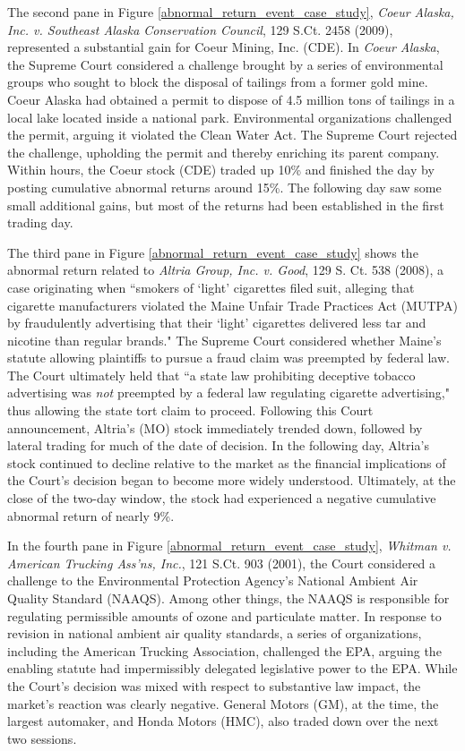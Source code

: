 \documentclass[preprint,12pt]{elsarticle}
\begin{document}
The second pane in Figure \ref{abnormal_return_event_case_study},  \textit{Coeur Alaska, Inc. v. Southeast Alaska Conservation Council}, 129 S.Ct. 2458 (2009), represented a substantial gain for Coeur Mining, Inc. (CDE).  In \textit{Coeur Alaska}, the Supreme Court considered a challenge brought by a series of environmental groups who sought to block the disposal of tailings from a former gold mine.  Coeur Alaska had obtained a permit to dispose of 4.5 million tons of tailings in a local lake located inside a national park. Environmental organizations challenged the permit, arguing it violated the Clean Water Act.  The Supreme Court rejected the challenge, upholding the permit and thereby enriching its parent company.  Within hours, the Coeur stock (CDE) traded up 10\% and finished the day by posting cumulative abnormal returns around 15\%.  The following day saw some small additional gains, but most of the returns had been established in the first trading day.

The third pane in Figure \ref{abnormal_return_event_case_study} shows the abnormal return related to \textit{Altria Group, Inc. v. Good}, 129 S. Ct. 538 (2008), a case originating when ``smokers of `light' cigarettes filed suit, alleging that cigarette manufacturers violated the Maine Unfair Trade Practices Act (MUTPA) by fraudulently advertising that their `light' cigarettes delivered less tar and nicotine than regular brands." The Supreme Court considered whether Maine's statute allowing plaintiffs to pursue a fraud claim was preempted by federal law.  The Court ultimately held that ``a state law prohibiting deceptive tobacco advertising was \textit{not} preempted by a federal law regulating cigarette advertising," thus allowing the state tort claim to proceed.  Following this Court announcement, Altria's (MO) stock immediately trended down, followed by lateral trading for much of the date of decision.  In the following day, Altria's stock continued to decline relative to the market as the financial implications of the Court's decision began to become more widely understood.  Ultimately, at the close of the two-day window, the stock had experienced a negative cumulative abnormal return of nearly 9\%.   

In the fourth pane in Figure \ref{abnormal_return_event_case_study}, \textit{Whitman v. American Trucking Ass'ns, Inc.}, 121 S.Ct. 903 (2001), the Court considered a challenge to the Environmental Protection Agency's National Ambient Air Quality Standard (NAAQS). Among other things, the NAAQS is responsible for regulating permissible amounts of ozone and particulate matter.  In response to revision in national ambient air quality standards, a series of organizations, including the American Trucking Association, challenged the EPA, arguing the enabling statute had impermissibly delegated legislative power to the EPA.  While the Court's decision was mixed with respect to substantive law impact, the market's reaction was clearly negative.  General Motors (GM), at the time, the largest automaker, and Honda Motors (HMC), also traded down over the next two sessions.
\end{document}
